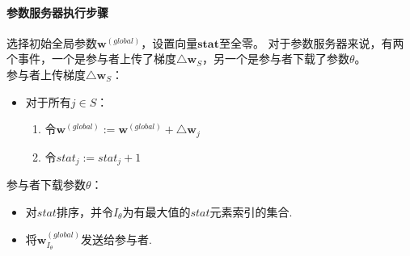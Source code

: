 \documentclass[a4paper]{article}
\begin{document}
\paragraph{参数服务器执行步骤}
选择初始全局参数$\bm{w}^{(global)}$，设置向量$\bm{stat}$至全零。
对于参数服务器来说，有两个事件，一个是参与者上传了梯度$\triangle\bm{w}_S$，另一个是参与者下载了参数$\theta$。\\
参与者上传梯度$\triangle\bm{w}_S$：
\begin{itemize}
\item 对于所有$j\in S$：
	\begin{enumerate}
	\item 令$\bm{w}^{(global)}:=\bm{w}^{(global)}+\triangle\bm{w}_j$
	\item 令$stat_j:=stat_j+1$
	\end{enumerate}
\end{itemize}
参与者下载参数$\theta$：
\begin{itemize}
\item 对$stat$排序，并令$I_\theta$为有最大值的$stat$元素索引的集合.
\item 将$\bm{w}_{I_\theta}^{(global)}$发送给参与者.
\end{itemize}



\end{document}
